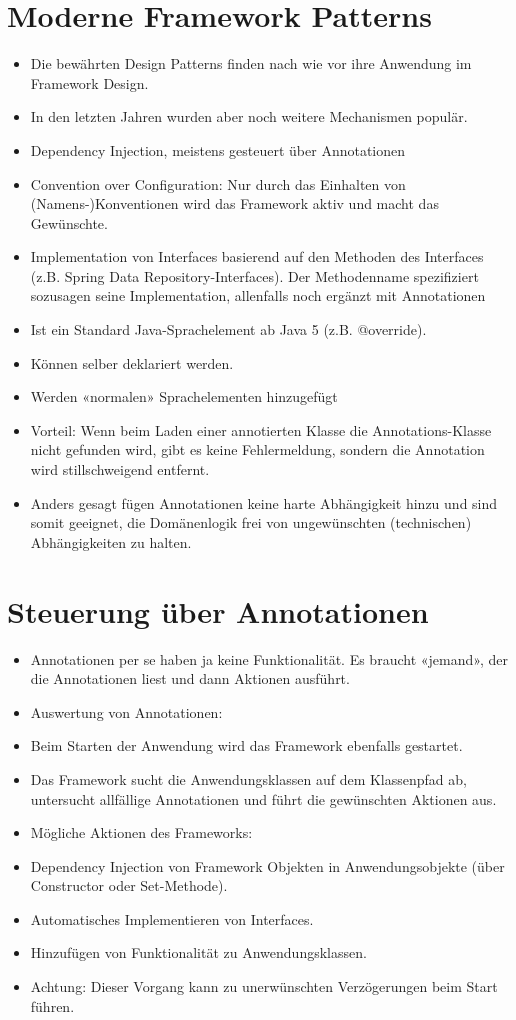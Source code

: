\section*{Moderne Framework Patterns}
\begin{itemize}
  \item Die bewährten Design Patterns finden nach wie vor ihre Anwendung im Framework Design.
  \item In den letzten Jahren wurden aber noch weitere Mechanismen populär.
  \item Dependency Injection, meistens gesteuert über Annotationen
  \item Convention over Configuration: Nur durch das Einhalten von (Namens-)Konventionen wird das Framework aktiv und macht das Gewünschte.
  \item Implementation von Interfaces basierend auf den Methoden des Interfaces (z.B. Spring Data Repository-Interfaces). Der Methodenname spezifiziert sozusagen seine Implementation, allenfalls noch ergänzt mit Annotationen
  \item Ist ein Standard Java-Sprachelement ab Java 5 (z.B. @override).
  \item Können selber deklariert werden.
  \item Werden «normalen» Sprachelementen hinzugefügt
  \item Vorteil: Wenn beim Laden einer annotierten Klasse die Annotations-Klasse nicht gefunden wird, gibt es keine Fehlermeldung, sondern die Annotation wird stillschweigend entfernt.
  \item Anders gesagt fügen Annotationen keine harte Abhängigkeit hinzu und sind somit geeignet, die Domänenlogik frei von ungewünschten (technischen) Abhängigkeiten zu halten.
\end{itemize}

\section*{Steuerung über Annotationen}
\begin{itemize}
  \item Annotationen per se haben ja keine Funktionalität. Es braucht «jemand», der die Annotationen liest und dann Aktionen ausführt.
  \item Auswertung von Annotationen:
  \item Beim Starten der Anwendung wird das Framework ebenfalls gestartet.
  \item Das Framework sucht die Anwendungsklassen auf dem Klassenpfad ab, untersucht allfällige Annotationen und führt die gewünschten Aktionen aus.
  \item Mögliche Aktionen des Frameworks:
  \item Dependency Injection von Framework Objekten in Anwendungsobjekte (über Constructor oder Set-Methode).
  \item Automatisches Implementieren von Interfaces.
  \item Hinzufügen von Funktionalität zu Anwendungsklassen.
  \item Achtung: Dieser Vorgang kann zu unerwünschten Verzögerungen beim Start führen.
\end{itemize}

